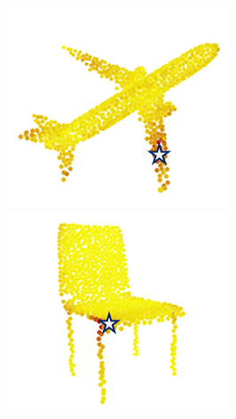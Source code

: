 \documentclass[letterpaper]{article} %
\begin{document}
\begin{figure}[htbp]
\begin{center}
\begin{minipage}[b]{0.8\linewidth}
\begin{center}
\begin{minipage}[b]{0.12\linewidth}
\end{minipage}
\begin{minipage}[b]{0.12\linewidth}
\begin{center}
\includegraphics[width=1.0\linewidth]{images/atten_pic/airplane_feature_3.png}
\end{center}
\end{minipage}
\begin{minipage}[b]{0.12\linewidth}
\begin{center}
\includegraphics[width=1.0\linewidth]{images/atten_pic/chair_feature_1.png}

\end{center}
\end{minipage}
\end{center}
\end{minipage}
\end{center}
\end{figure}
\end{document}
